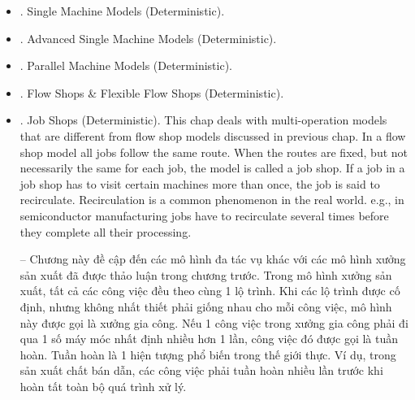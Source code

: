 \documentclass{article}
\newtheorem{example}{Example}
\begin{document}
\begin{itemize}
\begin{itemize}
        -- Nghiên cứu trước đây đặc biệt tập trung vào ranh giới giữa các bài toán có thể giải được trong thời gian đa thức \& bài toán NP-khó. Ví dụ, trong chuỗi bài toán được mô tả ở trên, $1||\sum w_jC_j$ có thể được giải trong thời gian đa thức, trong khi $Pm||\sum w_jC_j$ là NP-khó, ngụ ý rằng $Qm|prec|\sum w_jC_j$ cũng là NP-khó. Các ví dụ sau minh họa ranh giới giữa các bài toán dễ \& khó trong các tập bài toán cho trước.

        \begin{example}[A complexity hierarchy]
            Consider problems: $1||C_{\max},P2||C_{\max},F2||C_{\max},Jm||C_{\max},FFc||C_{\max}$. {\sf Fig. 2.8: Complexity hierarchy of problems in Example 2.4.1}.
        \end{example}

        \begin{example}[A complexity hierarchy]
            Consider problems: $1||L_{\max},1|prmp|L_{\max},1|r_j|L_{\max},1|r_j,prmp|L_{\max},Pm||L_{\max}$. {\sf Fig. 2.8: Complexity hierarchy of problems in Example 2.4.2}.
        \end{example}
    \end{itemize}
    \item {. Single Machine Models (Deterministic).}
    \item {. Advanced Single Machine Models (Deterministic).}
    \item {. Parallel Machine Models (Deterministic).}
    \item {. Flow Shops \& Flexible Flow Shops (Deterministic).}
    \item {. Job Shops (Deterministic).} This chap deals with multi-operation models that are different from flow shop models discussed in previous chap. In a flow shop model all jobs follow the same route. When the routes are fixed, but not necessarily the same for each job, the model is called a job shop. If a job in a job shop has to visit certain machines more than once, the job is said to recirculate. Recirculation is a common phenomenon in the real world. e.g., in semiconductor manufacturing jobs have to recirculate several times before they complete all their processing.

    -- Chương này đề cập đến các mô hình đa tác vụ khác với các mô hình xưởng sản xuất đã được thảo luận trong chương trước. Trong mô hình xưởng sản xuất, tất cả các công việc đều theo cùng 1 lộ trình. Khi các lộ trình được cố định, nhưng không nhất thiết phải giống nhau cho mỗi công việc, mô hình này được gọi là xưởng gia công. Nếu 1 công việc trong xưởng gia công phải đi qua 1 số máy móc nhất định nhiều hơn 1 lần, công việc đó được gọi là tuần hoàn. Tuần hoàn là 1 hiện tượng phổ biến trong thế giới thực. Ví dụ, trong sản xuất chất bán dẫn, các công việc phải tuần hoàn nhiều lần trước khi hoàn tất toàn bộ quá trình xử lý.


\end{itemize}
\end{document}
